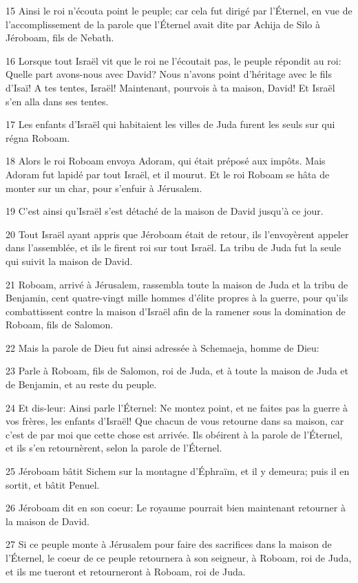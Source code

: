 \par 15 Ainsi le roi n'écouta point le peuple; car cela fut dirigé par l'Éternel, en vue de l'accomplissement de la parole que l'Éternel avait dite par Achija de Silo à Jéroboam, fils de Nebath.
\par 16 Lorsque tout Israël vit que le roi ne l'écoutait pas, le peuple répondit au roi: Quelle part avons-nous avec David? Nous n'avons point d'héritage avec le fils d'Isaï! A tes tentes, Israël! Maintenant, pourvois à ta maison, David! Et Israël s'en alla dans ses tentes.
\par 17 Les enfants d'Israël qui habitaient les villes de Juda furent les seuls sur qui régna Roboam.
\par 18 Alors le roi Roboam envoya Adoram, qui était préposé aux impôts. Mais Adoram fut lapidé par tout Israël, et il mourut. Et le roi Roboam se hâta de monter sur un char, pour s'enfuir à Jérusalem.
\par 19 C'est ainsi qu'Israël s'est détaché de la maison de David jusqu'à ce jour.
\par 20 Tout Israël ayant appris que Jéroboam était de retour, ils l'envoyèrent appeler dans l'assemblée, et ils le firent roi sur tout Israël. La tribu de Juda fut la seule qui suivit la maison de David.
\par 21 Roboam, arrivé à Jérusalem, rassembla toute la maison de Juda et la tribu de Benjamin, cent quatre-vingt mille hommes d'élite propres à la guerre, pour qu'ils combattissent contre la maison d'Israël afin de la ramener sous la domination de Roboam, fils de Salomon.
\par 22 Mais la parole de Dieu fut ainsi adressée à Schemaeja, homme de Dieu:
\par 23 Parle à Roboam, fils de Salomon, roi de Juda, et à toute la maison de Juda et de Benjamin, et au reste du peuple.
\par 24 Et dis-leur: Ainsi parle l'Éternel: Ne montez point, et ne faites pas la guerre à vos frères, les enfants d'Israël! Que chacun de vous retourne dans sa maison, car c'est de par moi que cette chose est arrivée. Ils obéirent à la parole de l'Éternel, et ils s'en retournèrent, selon la parole de l'Éternel.
\par 25 Jéroboam bâtit Sichem sur la montagne d'Éphraïm, et il y demeura; puis il en sortit, et bâtit Penuel.
\par 26 Jéroboam dit en son coeur: Le royaume pourrait bien maintenant retourner à la maison de David.
\par 27 Si ce peuple monte à Jérusalem pour faire des sacrifices dans la maison de l'Éternel, le coeur de ce peuple retournera à son seigneur, à Roboam, roi de Juda, et ils me tueront et retourneront à Roboam, roi de Juda.
